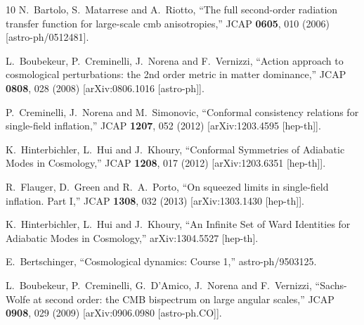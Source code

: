 \documentclass[12pt]{article}
\numberwithin{equation}{section}
\begin{document}
{\begin{thebibliography}{10}
  N.~Bartolo, S.~Matarrese and A.~Riotto,
  ``The full second-order radiation transfer function for large-scale cmb anisotropies,''
  JCAP {\bf 0605}, 010 (2006)
  [astro-ph/0512481].

  L.~Boubekeur, P.~Creminelli, J.~Norena and F.~Vernizzi,
  ``Action approach to cosmological perturbations: the 2nd order metric in matter dominance,''
  JCAP {\bf 0808}, 028 (2008)
  [arXiv:0806.1016 [astro-ph]].

  P.~Creminelli, J.~Norena and M.~Simonovic,
  ``Conformal consistency relations for single-field inflation,''
  JCAP {\bf 1207}, 052 (2012)
  [arXiv:1203.4595 [hep-th]].

  K.~Hinterbichler, L.~Hui and J.~Khoury,
  ``Conformal Symmetries of Adiabatic Modes in Cosmology,''
  JCAP {\bf 1208}, 017 (2012)
  [arXiv:1203.6351 [hep-th]].

  R.~Flauger, D.~Green and R.~A.~Porto,
  ``On squeezed limits in single-field inflation.  Part I,''
  JCAP {\bf 1308}, 032 (2013)
  [arXiv:1303.1430 [hep-th]].

  K.~Hinterbichler, L.~Hui and J.~Khoury,
  ``An Infinite Set of Ward Identities for Adiabatic Modes in Cosmology,''
  arXiv:1304.5527 [hep-th].

  E.~Bertschinger,
  ``Cosmological dynamics: Course 1,''
  astro-ph/9503125.

  L.~Boubekeur, P.~Creminelli, G.~D'Amico, J.~Norena and F.~Vernizzi,
  ``Sachs-Wolfe at second order: the CMB bispectrum on large angular scales,''
  JCAP {\bf 0908}, 029 (2009)
  [arXiv:0906.0980 [astro-ph.CO]].


\end{thebibliography}}
\end{document}
